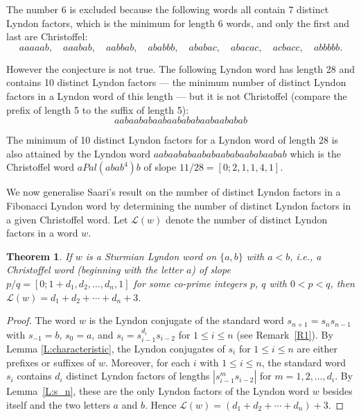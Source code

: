 \documentclass[11pt]{amsart}
\newcommand{\1}{\bar{1}}
\theoremstyle{plain}
\newtheorem{theorem}{Theorem}
\theoremstyle{definition}
\theoremstyle{remark}
\begin{document}
The number 6 is excluded because the following words all contain 7 distinct Lyndon factors, which is the minimum for length 6 words, and only the first and last are Christoffel:
\[
aaaaab, \quad  aaabab , \quad  aabbab , \quad  ababbb , \quad  ababac , \quad  abacac , \quad  acbacc , \quad  abbbbb.
\]

However the conjecture is not true.  The following Lyndon word has length 28 and contains 10 distinct Lyndon factors --- the minimum number of distinct Lyndon factors in a Lyndon word of this length --- but it is not Christoffel (compare the prefix of length 5 to the suffix of length 5):
\[
aabaababaabaabababaabaababab
\]

The minimum of 10 distinct Lyndon factors for a Lyndon word of length $28$ is also attained by the Lyndon word $aabaababaababaababaababaabab$ which is the Christoffel word $aPal(abab^4)b$ of slope $11/28=[0;2,1,1,4,1]$.


We now generalise Saari's result on the number of distinct Lyndon factors in a Fibonacci Lyndon word by determining the number of distinct Lyndon factors in a given Christoffel word. Let $\mathcal{L}(w)$ denote the number of distinct Lyndon factors in a word $w$.








\begin{theorem}  \label{T:christoffel}
If $w$ is a Sturmian Lyndon word on $\{a,b\}$ with $a < b$, i.e., a Christoffel word (beginning with the letter $a$) of slope $p/q=[0; 1+d_1, d_2, \ldots, d_n, 1]$ for some co-prime integers $p$, $q$ with $0 < p < q$, then $\mathcal{L}(w) = d_1+d_2+\cdots+d_n+3$.
\end{theorem}
\begin{proof} The word $w$ is the Lyndon conjugate of the standard word $s_{n+1} = s_{n}s_{n-1}$ with $s_{-1}=b$, $s_0=a$, and $s_i = s_{i-1}^{d_i}s_{i-2}$ for $1 \leq i \le n$ (see Remark~\ref{R1}). By Lemma \ref{L:characteristic}, the Lyndon conjugates of $s_i$ for $1 \leq i \leq n$ are either prefixes or suffixes of $w$. Moreover, for each $i$ with $1 \leq i \leq n$, the standard word $s_i$ contains $d_{i}$ distinct Lyndon factors of lengths $|s_{i-1}^ms_{i-2}|$ for $m= 1, 2, \ldots, d_i$. By Lemma~\ref{L:s_n}, these are the only Lyndon factors of the Lyndon word $w$ besides itself and the two letters $a$ and $b$. Hence $\mathcal{L}(w) = (d_1 + d_2 + \cdots + d_n) + 3$.
\end{proof}
\end{document}
